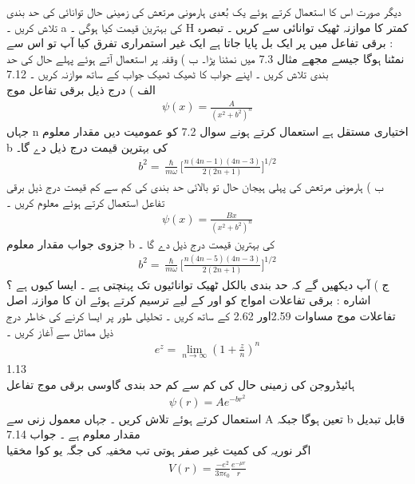  دیگر صورت
اس کا استعمال کرتے ہوئے یک بُعدی ہارمونی مرتعش کی زمینی حال توانائی کی حد بندی تلاش کریں ۔ a کی بہترین قیمت کیا ہوگی ۔ H کمتر کا موازنہ ٹھیک توانائی سے کریں ۔
تبصرہ : برقی تفاعل میں  پر ایک بل پایا جاتا ہے ایک غیر استمراری تفرق کیا آپ تو اس سے نمٹنا ہوگا جیسے مجھے مثال 7.3 میں نمٹنا پڑا۔
ب ) وقفہ  پر  استعمال آتے ہوئے پہلے حال کی حد بندی تلاش کریں ۔ اپنے جواب کا ٹھیک ٹھیک جواب کے ساتھ موازنہ کریں ۔
7.12\\
الف ) درج ذیل برقی تفاعل موج 
\begin{align}
\psi(x)=\frac{A}{(x^{2}+b^{2})^n} 
\end{align}
 جہاں n اختیاری مستقل ہے استعمال کرتے ہونے سوال 7.2 کو عمومیت دیں مقدار معلوم b کی بہترین قیمت درج ذیل دے گا۔
\begin{align}
b^{2}=\frac{\hslash}{m\omega}\big[\frac{n(4n-1)(4n-3)}{2(2n+1)}\big]^{1/2} 
\end{align}
 ب ) ہارمونی مرتعش کی پہلی ہیجان حال تو بالائی حد بندی کی کم سے کم قیمت درج ذیل برقی تفاعل استعمال کرتے ہوئے معلوم کریں ۔
\begin{align}
\psi(x)=\frac{Bx}{(x^{2}+b^{2})^n} 
\end{align}
 جزوی جواب مقدار معلوم b کی بہترین قیمت درج ذیل دے گا ۔
\begin{align}
b^{2}=\frac{\hslash}{m\omega}\big[\frac{n(4n-5)(4n-3)}{2(2n+1)}\big]^{1/2} 
\end{align}
 ج ) آپ دیکھیں گے کہ  حد بندی بالکل ٹھیک توانائیوں تک پہنچتی ہے ۔ ایسا کیوں ہے ؟
اشاره : برقی تفاعلات امواج کو  اور  کے لیے ترسیم کرتے ہوئے ان کا موازنہ اصل تفاعلات موج مساوات 2.59اور 2.62 کے ساتھ کریں ۔ تحلیلی طور پر ایسا کرنے کی خاطر درج ذیل مماثل سے آغاز کریں ۔
\begin{align}
e^{z}=\lim_{n \to \infty}(1+\frac{z}{n})^{n} 
\end{align}
1.13\\
ہائیڈروجن کی زمینی حال کی کم سے کم حد بندی گاوسی برقی موج تفاعل
\begin{align}
\psi(r)=Ae^{-br^{2}} 
\end{align}
 استعمال کرتے ہوئے تلاش کریں ۔ جہاں معمول زنی سے A تعین ہوگا جبکہ b قابل تبدیل مقدار معلوم ہے ۔ جواب 
7.14\\
اگر نوریہ کی کمیت غیر صفر  ہوتی تب مخفیہ کی جگہ یو کوا مخقیا
\begin{align}
V(r)=\frac{-e^{2}}{3\pi\epsilon_{0}}\frac{e^{-\mu r}}{r} 
\end{align}
